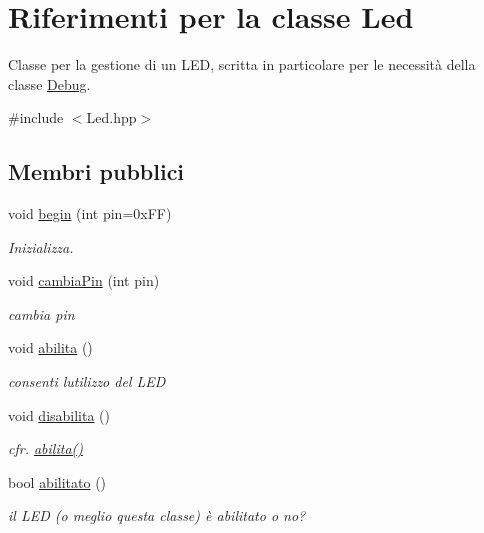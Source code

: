 \hypertarget{class_led}{}\section{Riferimenti per la classe Led}
\label{class_led}


Classe per la gestione di un L\+ED, scritta in particolare per le necessità della classe \hyperlink{class_debug}{Debug}.  




{\ttfamily \#include $<$Led.\+hpp$>$}

\subsection*{Membri pubblici}
\begin{DoxyCompactItemize}
\item 
void \hyperlink{class_led_ad0485b411fd3309eab094f0ad252f6f7}{begin} (int pin=0x\+F\+F)
\begin{DoxyCompactList}\small\item\em Inizializza. \end{DoxyCompactList}\item 
void \hyperlink{class_led_a38129e9ebf1bd161c46b0dd26263ba89}{cambia\+Pin} (int pin)
\begin{DoxyCompactList}\small\item\em cambia pin \end{DoxyCompactList}\item 
void \hyperlink{class_led_a7334b8983c471eb8ef81c5b6ac1a2f95}{abilita} ()
\begin{DoxyCompactList}\small\item\em consenti l\textquotesingle{}utilizzo del L\+ED \end{DoxyCompactList}\item 
void \hyperlink{class_led_a0a8956cf88323db574ce0557a98a2393}{disabilita} ()
\begin{DoxyCompactList}\small\item\em cfr. {\ttfamily \hyperlink{class_led_a7334b8983c471eb8ef81c5b6ac1a2f95}{abilita()}} \end{DoxyCompactList}\item 
bool \hyperlink{class_led_ababc80f90c068302fe021539f80ccc5f}{abilitato} ()
\begin{DoxyCompactList}\small\item\em il L\+ED (o meglio questa classe) è abilitato o no? \end{DoxyCompactList}\item 

\end{DoxyCompactItemize}
